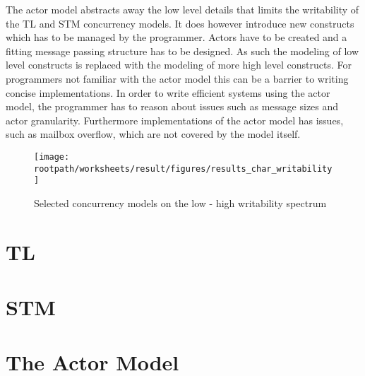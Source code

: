 The actor model abstracts away the low level details that limits the writability of the \ac{TL} and \ac{STM} concurrency models. It does however introduce new constructs which has to be managed by the programmer. Actors have to be created and a fitting message passing structure has to be designed. As such the modeling of low level constructs is replaced with the modeling of more high level constructs. For programmers not familiar with the actor model this can be a barrier to writing concise implementations. In order to write efficient systems using the actor model, the programmer has to reason about issues such as message sizes and actor granularity. Furthermore implementations of the actor model has issues, such as mailbox overflow, which are not covered by the model itself.

\begin{figure}[htbp]
\centering
 \texttt{[image: \\rootpath/worksheets/result/figures/results\_char\_writability]} 
 \caption{Selected concurrency models on the low - high writability spectrum}
\label{fig:results_char_writability}
\end{figure}

\section{\acl{TL}}

\section{\acl{STM}}
\section{The Actor Model}

\worksheetend
